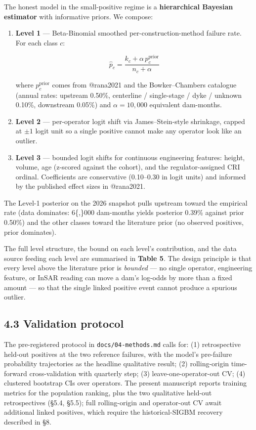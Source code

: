 \documentclass[
  11pt]{article}
\begin{document}
The honest model in the small-positive regime is a \textbf{hierarchical
Bayesian estimator} with informative priors. We compose:

\begin{enumerate}
\def\labelenumi{\arabic{enumi}.}
\item
  \textbf{Level 1} --- Beta-Binomial smoothed per-construction-method
  failure rate. For each class \(c\):

  \[ \hat p_c = \frac{k_c + \alpha\, p^{\text{prior}}_c}{n_c + \alpha} \]

  where \(p^{\text{prior}}_c\) comes from @rana2021 and the
  Bowker--Chambers catalogue (annual rates: upstream 0.50\%, centerline
  / single-stage / dyke / unknown 0.10\%, downstream 0.05\%) and
  \(\alpha = 10{,}000\) equivalent dam-months.
\item
  \textbf{Level 2} --- per-operator logit shift via James--Stein-style
  shrinkage, capped at \(\pm 1\) logit unit so a single positive cannot
  make any operator look like an outlier.
\item
  \textbf{Level 3} --- bounded logit shifts for continuous engineering
  features: height, volume, age (z-scored against the cohort), and the
  regulator-assigned CRI ordinal. Coefficients are conservative
  (0.10--0.30 in logit units) and informed by the published effect sizes
  in @rana2021.
\end{enumerate}

The Level-1 posterior on the 2026 snapshot pulls upstream toward the
empirical rate (data dominates: 6\{,\}000 dam-months yields posterior
0.39\% against prior 0.50\%) and the other classes toward the literature
prior (no observed positives, prior dominates).

The full level structure, the bound on each level's contribution, and
the data source feeding each level are summarised in \textbf{Table 5}.
The design principle is that every level above the literature prior is
\emph{bounded} --- no single operator, engineering feature, or InSAR
reading can move a dam's log-odds by more than a fixed amount --- so
that the single linked positive event cannot produce a spurious outlier.

\subsection{4.3 Validation protocol}\label{validation-protocol}

The pre-registered protocol in \texttt{docs/04-methods.md} calls for:
(1) retrospective held-out positives at the two reference failures, with
the model's pre-failure probability trajectories as the headline
qualitative result; (2) rolling-origin time-forward cross-validation
with quarterly step; (3) leave-one-operator-out CV; (4) clustered
bootstrap CIs over operators. The present manuscript reports training
metrics for the population ranking, plus the two qualitative held-out
retrospectives (§5.4, §5.5); full rolling-origin and operator-out CV
await additional linked positives, which require the historical-SIGBM
recovery described in §8.
\end{document}
